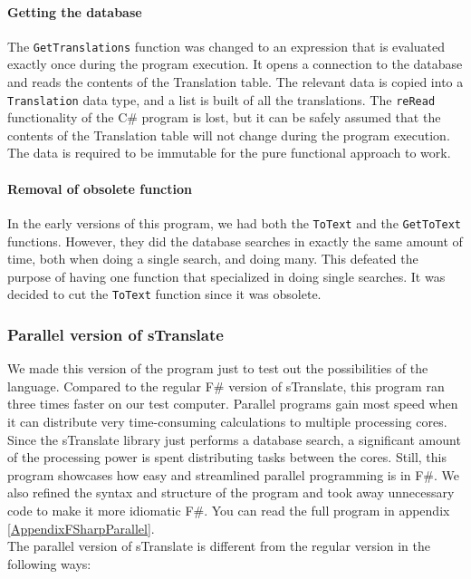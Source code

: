 \documentclass[12pt, a4paper]{article}
\newcommand{\code}[1]{{\small \texttt{#1}}}
\begin{document}
\paragraph{Getting the database} The \code{GetTranslations} function was changed to an expression that is evaluated exactly once during the program execution. It opens a connection to the database and reads the contents of the Translation table. The relevant data is copied into a \code{Translation} data type, and a list is built of all the translations. The \code{reRead} functionality of the C\# program is lost, but it can be safely assumed that the contents of the Translation table will not change during the program execution. The data is required to be immutable for the pure functional approach to work.

\paragraph{Removal of obsolete function} In the early versions of this program, we had both the \code{ToText} and the \code{GetToText} functions. However, they did the database searches in exactly the same amount of time, both when doing a single search, and doing many. This defeated the purpose of having one function that specialized in doing single searches. It was decided to cut the \code{ToText} function since it was obsolete.

\newpage


\subsubsection{Parallel version of sTranslate}
We made this version of the program just to test out the possibilities of the language. Compared to the regular F\# version of sTranslate, this program ran three times faster on our test computer. Parallel programs gain most speed when it can distribute very time-consuming calculations to multiple processing cores. Since the sTranslate library just performs a database search, a significant amount of the processing power is spent distributing tasks between the cores. Still, this program showcases how easy and streamlined parallel programming is in F\#. We also refined the syntax and structure of the program and took away unnecessary code to make it more idiomatic F\#. You can read the full program in appendix \ref{AppendixFSharpParallel}.\\

The parallel version of sTranslate is different from the regular version in the following ways:
\end{document}
